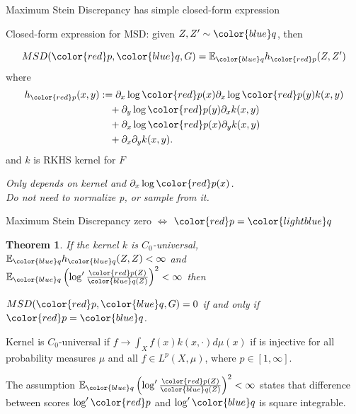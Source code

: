 \documentclass{beamer}
\newtheorem{thm}{Theorem}
\begin{document}
\begin{frame}{Maximum Stein Discrepancy has simple closed-form expression}

Closed-form expression for MSD: given $Z,Z'  \sim { \color{blue} q}$, then


\Large
\[MSD({\color{red} p},{ \color{blue} q},G) = \ev_{{ \color{blue} q}} h_{{\color{red} p}}(Z,Z')\]
\normalsize
where
  \begin{align*}
h_{{\color{red} p}}(x,y) & := \partial_{x} \log {\color{red} p}(x) \partial_{x} \log {\color{red} p}(y) k(x,y)\\
 & \quad+\partial_{y} \log {\color{red} p}(y) \partial_{x}  k(x,y)\\
 & \quad+\partial_{x} \log {\color{red} p}(x) \partial_{y}k(x,y)\\
 & \quad+\partial_{x} \partial_{y} k(x,y).
\end{align*}
and $k$ is RKHS kernel for $F$



\begin{center}
 {\large\emph{  Only depends on kernel and $\partial_{x} \log {\color{red} p}(x)$. \\ Do not need
to normalize {\color{red} p}, or sample from it.   }}
 \end{center}


  
\end{frame}



\begin{frame}{Maximum Stein Discrepancy zero $\iff$ ${ \color{red} p} =  {\color{lightblue} q}$}

\begin{thm}
  If the kernel $k$ is $C_0$-universal, $\ev_{{ \color{blue} q}} h_{{ \color{blue} q}}(Z,Z)<\infty$ and\\
  $\ev_{{ \color{blue} q}} \left( \log' \frac{{\color{red} p}(Z)}{{ \color{blue} q}(Z)} \right)^{2}<\infty$
 then
\begin{center}
\large
  $MSD({\color{red} p},{ \color{blue} q},G) =0$ if and only if ${\color{red} p}={ \color{blue} q}$.
\normalsize
\end{center}
\end{thm}

\vspace{10mm}
\footnotesize{
Kernel is $C_0$-universal if  $f \to \int_X f(x) k(x,\cdot) d\mu(x)$ if is injective for all probability measures $\mu$ and all  $f \in L^p(X,\mu)$, where  $p \in [1,\infty] $. 

The assumption $\ev_{{ \color{blue} q}} \left(\log' \frac{{\color{red} p}(Z)}{{ \color{blue} q}(Z)}\right)^{2}<\infty$ states that difference between scores $\log' \color{red} p$ and $\log' \color{blue} q$  is square integrable. 
}

\end{frame} 
\end{document}
